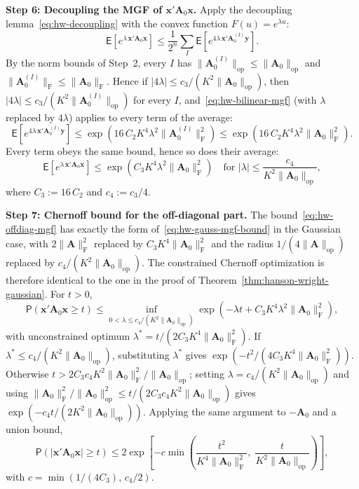 \documentclass[12pt,a4paper]{article}
\makeatletter
\theoremstyle{definition}
\renewenvironment{proof}[1][\proofname]{\par
  \pushQED{\qed}%
  \normalfont \topsep6\p@\@plus6\p@\relax
  \trivlist
  \item[\hskip\labelsep\bfseries #1\@addpunct{.}]\ignorespaces
}{%
  \popQED\endtrivlist\@endpefalse
}
\newcommand\expc{\mathsf{E}}
\newcommand\prb{\mathsf{P}}
\newcommand{\by}{\mathbf{y}}
\newcommand{\bx}{\mathbf{x}}
\newcommand{\bA}{\mathbf{A}}
\newcommand{\opnorm}[1]{\|#1\|_{\mathrm{op}}}
\newcommand{\fnorm}[1]{\|#1\|_{\mathrm{F}}}
\makeatother
\begin{document}
\begin{proof}
\textbf{Step 6: Decoupling the MGF of $\bx'\bA_0\bx$.} Apply the decoupling lemma~\eqref{eq:hw-decoupling} with the convex function $F(u) = e^{\lambda u}$:
\[
\expc\!\left[e^{\lambda\,\bx'\bA_0\bx}\right] \leqslant \frac{1}{2^n}\sum_I \expc\!\left[e^{4\lambda\,\bx'\bA_0^{(I)}\by}\right].
\]
By the norm bounds of Step~2, every $I$ has $\opnorm{\bA_0^{(I)}} \leqslant \opnorm{\bA_0}$ and $\fnorm{\bA_0^{(I)}} \leqslant \fnorm{\bA_0}$. Hence if $|4\lambda| \leqslant c_3/(K^2\opnorm{\bA_0})$, then $|4\lambda| \leqslant c_3/(K^2\opnorm{\bA_0^{(I)}})$ for every $I$, and~\eqref{eq:hw-bilinear-mgf} (with $\lambda$ replaced by $4\lambda$) applies to every term of the average:
\[
\expc\!\left[e^{4\lambda\,\bx'\bA_0^{(I)}\by}\right] \leqslant \exp\!\left(16\,C_2 K^4\lambda^2\fnorm{\bA_0^{(I)}}^2\right) \leqslant \exp\!\left(16\,C_2 K^4\lambda^2\fnorm{\bA_0}^2\right).
\]
Every term obeys the same bound, hence so does their average:
\begin{equation}\label{eq:hw-offdiag-mgf}
\expc\!\left[e^{\lambda\,\bx'\bA_0\bx}\right] \leqslant \exp\!\left(C_3 K^4\lambda^2\fnorm{\bA_0}^2\right) \quad \text{for } |\lambda| \leqslant \frac{c_4}{K^2\opnorm{\bA_0}},
\end{equation}
where $C_3 := 16\,C_2$ and $c_4 := c_3/4$.

\textbf{Step 7: Chernoff bound for the off-diagonal part.} The bound~\eqref{eq:hw-offdiag-mgf} has exactly the form of~\eqref{eq:hw-gauss-mgf-bound} in the Gaussian case, with $2\fnorm{\bA}^2$ replaced by $C_3 K^4\fnorm{\bA_0}^2$ and the radius $1/(4\opnorm{\bA})$ replaced by $c_4/(K^2\opnorm{\bA_0})$. The constrained Chernoff optimization is therefore identical to the one in the proof of Theorem~\ref{thm:hanson-wright-gaussian}. For $t > 0$,
\[
\prb(\bx'\bA_0\bx \geqslant t) \leqslant \inf_{0 < \lambda \leqslant c_4/(K^2\opnorm{\bA_0})} \exp\!\left(-\lambda t + C_3 K^4\lambda^2\fnorm{\bA_0}^2\right),
\]
with unconstrained optimum $\lambda^* = t/(2C_3 K^4\fnorm{\bA_0}^2)$. If $\lambda^* \leqslant c_4/(K^2\opnorm{\bA_0})$, substituting $\lambda^*$ gives $\exp(-t^2/(4C_3 K^4\fnorm{\bA_0}^2))$. Otherwise $t > 2C_3 c_4 K^2\fnorm{\bA_0}^2/\opnorm{\bA_0}$; setting $\lambda = c_4/(K^2\opnorm{\bA_0})$ and using $\fnorm{\bA_0}^2/\opnorm{\bA_0}^2 \leqslant t/(2C_3 c_4 K^2\opnorm{\bA_0})$ gives $\exp(-c_4 t/(2K^2\opnorm{\bA_0}))$. Applying the same argument to $-\bA_0$ and a union bound,
\begin{equation}\label{eq:hw-offdiag-tail}
\prb(|\bx'\bA_0\bx| \geqslant t) \leqslant 2\exp\!\left[-c\min\!\left(\frac{t^2}{K^4\fnorm{\bA_0}^2},\; \frac{t}{K^2\opnorm{\bA_0}}\right)\right],
\end{equation}
with $c = \min(1/(4C_3),\, c_4/2)$.


\end{proof}
\end{document}
